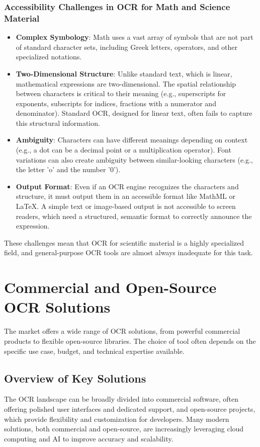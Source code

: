 \subsubsection{Accessibility Challenges in OCR for Math and Science Material}
\label{ssubsec:ocr-math-accessibility-challenges}
\begin{itemize}
	\item \textbf{Complex Symbology}: Math uses a vast array of symbols that are not part of standard character sets, including Greek letters, operators, and other specialized notations.
	\item \textbf{Two-Dimensional Structure}: Unlike standard text, which is linear, mathematical expressions are two-dimensional. The spatial relationship between characters is critical to their meaning (e.g., superscripts for exponents, subscripts for indices, fractions with a numerator and denominator). Standard OCR, designed for linear text, often fails to capture this structural information.
	\item \textbf{Ambiguity}: Characters can have different meanings depending on context (e.g., a dot can be a decimal point or a multiplication operator). Font variations can also create ambiguity between similar-looking characters (e.g., the letter 'o' and the number '0').
	\item \textbf{Output Format}: Even if an OCR engine recognizes the characters and structure, it must output them in an accessible format like MathML or LaTeX. A simple text or image-based output is not accessible to screen readers, which need a structured, semantic format to correctly announce the expression.
\end{itemize}
These challenges mean that OCR for scientific material is a highly specialized field, and general-purpose OCR tools are almost always inadequate for this task.

\section{Commercial and Open-Source OCR Solutions}
\label{sec:ocr-solutions}
The market offers a wide range of OCR solutions, from powerful commercial products to flexible open-source libraries. The choice of tool often depends on the specific use case, budget, and technical expertise available.

\subsection{Overview of Key Solutions}
\label{subsec:ocr-solutions-overview}
The OCR landscape can be broadly divided into commercial software, often offering polished user interfaces and dedicated support, and open-source projects, which provide flexibility and customization for developers. Many modern solutions, both commercial and open-source, are increasingly leveraging cloud computing and AI to improve accuracy and scalability.

